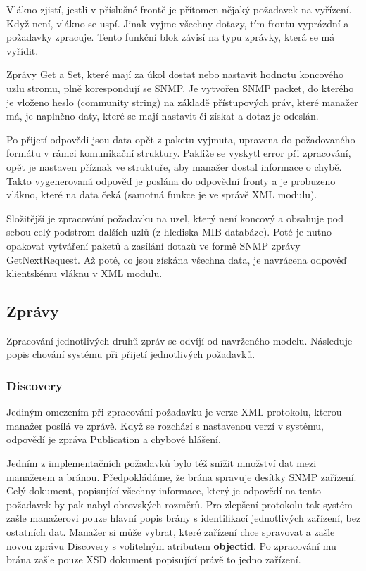 Vlákno zjistí, jestli v příslušné frontě je přítomen nějaký požadavek na vyřízení. Když není, vlákno se uspí. Jinak vyjme všechny dotazy, tím frontu vyprázdní a
požadavky zpracuje. Tento funkční blok závisí na typu zprávky, která se má vyřídit. 

Zprávy Get a Set, které mají za úkol dostat nebo nastavit hodnotu koncového uzlu stromu, plně korespondují se SNMP. Je vytvořen SNMP packet, do kterého je vloženo
heslo (community string) na základě přístupových práv, které manažer má, je naplněno daty, které se mají nastavit či získat a dotaz je odeslán.

Po přijetí odpovědi jsou data opět z paketu vyjmuta, upravena do požadovaného formátu v rámci komunikační struktury. Pakliže se vyskytl error při zpracování, opět
je nastaven příznak ve struktuře, aby manažer dostal informace o chybě. Takto vygenerovaná odpověď je poslána do odpovědní fronty a je probuzeno vlákno, které na
data čeká (samotná funkce je ve správě XML modulu).

Složitější je zpracování požadavku na uzel, který není koncový a obsahuje pod sebou celý podstrom dalších uzlů (z hlediska MIB databáze). Poté je nutno opakovat
vytváření paketů a zasílání dotazů ve formě SNMP zprávy GetNextRequest. Až poté, co jsou získána všechna data, je navrácena odpověď klientskému vláknu v XML modulu.


\subsection{Zprávy}
Zpracování jednotlivých druhů zpráv se odvíjí od navrženého modelu. Následuje popis chování systému při přijetí jednotlivých požadavků.

\subsubsection*{Discovery}
Jediným omezením při zpracování požadavku je verze XML protokolu, kterou manažer posílá ve zprávě. Když se rozchází s nastavenou 
verzí v systému, odpovědí je zpráva Publication a chybové hlášení.

Jedním z implementačních požadavků bylo též snížit množství dat mezi manažerem a bránou. Předpokládáme, že brána spravuje
desítky SNMP zařízení. Celý dokument, popisující všechny informace, který je odpovědí na tento požadavek by pak nabyl
obrovských rozměrů. Pro zlepšení protokolu tak systém zašle manažerovi pouze hlavní popis brány s identifikací jednotlivých zařízení, bez ostatních dat.
Manažer si může vybrat, které zařízení chce spravovat a zašle novou zprávu Discovery s volitelným atributem \textbf{objectid}. Po zpracování
mu brána zašle pouze XSD dokument popisující právě to jedno zařízení.

